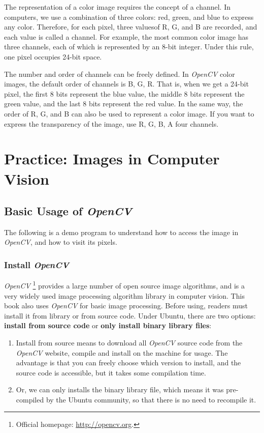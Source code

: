 The representation of a color image requires the concept of a channel. In computers, we use a combination of three colors: red, green, and blue to express any color. Therefore, for each pixel, three values ​​of R, G, and B are recorded, and each value is called a channel. For example, the most common color image has three channels, each of which is represented by an 8-bit integer. Under this rule, one pixel occupies 24-bit space.

The number and order of channels can be freely defined. In \textit{OpenCV} color images, the default order of channels is B, G, R. That is, when we get a 24-bit pixel, the first 8 bits represent the blue value, the middle 8 bits represent the green value, and the last 8 bits represent the red value. In the same way, the order of R, G, and B can also be used to represent a color image. If you want to express the transparency of the image, use R, G, B, A four channels.

\section{Practice: Images in Computer Vision}
\subsection{Basic Usage of \textit{OpenCV}}
The following is a demo program to understand how to access the image in \textit{OpenCV}, and how to visit its pixels.

\subsubsection{Install \textit{OpenCV}}
\textit{OpenCV} \footnote {Official homepage: \url{http://opencv.org}. } provides a large number of open source image algorithms, and is a very widely used image processing algorithm library in computer vision. This book also uses \textit{OpenCV} for basic image processing. Before using, readers must install it from library or from source code. Under Ubuntu, there are two options: \textbf{install from source code} or \textbf {only install binary library files}:

\begin{enumerate}
\item Install from source means to download all \textit{OpenCV} source code from the \textit{OpenCV} website, compile and install on the machine for usage. The advantage is that you can freely choose which version to install, and the source code is accessible, but it takes some compilation time.
\item Or, we can only installs the binary library file, which means it was pre-compiled by the Ubuntu community, so that there is no need to recompile it.
\end{enumerate}


